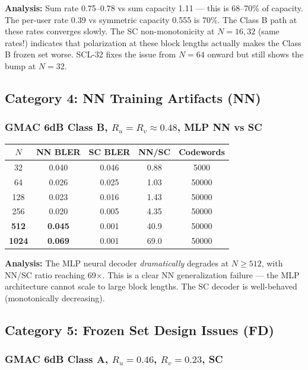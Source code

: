 \documentclass[11pt,a4paper]{article}
\newcommand{\up}[1]{\textcolor{upcolor}{\textbf{#1}}}
\begin{document}
\textbf{Analysis:} Sum rate 0.75--0.78 vs sum capacity 1.11 — this is 68--70\% of capacity. The per-user rate 0.39 vs symmetric capacity 0.555 is 70\%. The Class B path at these rates converges slowly. The SC non-monotonicity at $N=16,32$ (same rates!) indicates that polarization at these block lengths actually makes the Class B frozen set worse. SCL-32 fixes the issue from $N=64$ onward but still shows the bump at $N=32$.

\subsection{Category 4: NN Training Artifacts (NN)}

\subsubsection{GMAC 6dB Class B, $R_u=R_v\approx0.48$, MLP NN vs SC}

\begin{tabular}{ccccc}
\toprule
$N$ & NN BLER & SC BLER & NN/SC & Codewords \\
\midrule
32 & 0.040 & 0.046 & 0.88 & 5000 \\
64 & 0.026 & 0.025 & 1.03 & 50000 \\
128 & 0.023 & 0.016 & 1.43 & 50000 \\
256 & 0.020 & 0.005 & 4.35 & 50000 \\
\textbf{512} & \up{0.045} & 0.001 & 40.9 & 50000 \\
\textbf{1024} & \up{0.069} & 0.001 & 69.0 & 50000 \\
\bottomrule
\end{tabular}

\textbf{Analysis:} The MLP neural decoder \emph{dramatically} degrades at $N\ge512$, with NN/SC ratio reaching 69$\times$. This is a clear NN generalization failure — the MLP architecture cannot scale to large block lengths. The SC decoder is well-behaved (monotonically decreasing).

\subsection{Category 5: Frozen Set Design Issues (FD)}

\subsubsection{GMAC 6dB Class A, $R_u=0.46$, $R_v=0.23$, SC}
\end{document}
